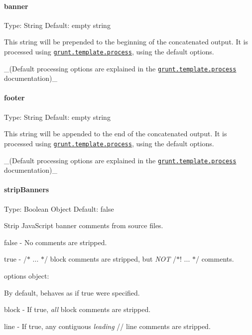 \paragraph*{banner}

Type\+: {\ttfamily String} Default\+: empty string

This string will be prepended to the beginning of the concatenated output. It is processed using \href{https://github.com/gruntjs/grunt-docs/blob/master/grunt.template.md#grunttemplateprocess}{\tt grunt.\+template.\+process}, using the default options.

\+\_\+(Default processing options are explained in the \href{https://github.com/gruntjs/grunt-docs/blob/master/grunt.template.md#grunttemplateprocess}{\tt grunt.\+template.\+process} documentation)\+\_\+

\paragraph*{footer}

Type\+: {\ttfamily String} Default\+: empty string

This string will be appended to the end of the concatenated output. It is processed using \href{https://github.com/gruntjs/grunt-docs/blob/master/grunt.template.md#grunttemplateprocess}{\tt grunt.\+template.\+process}, using the default options.

\+\_\+(Default processing options are explained in the \href{https://github.com/gruntjs/grunt-docs/blob/master/grunt.template.md#grunttemplateprocess}{\tt grunt.\+template.\+process} documentation)\+\_\+

\paragraph*{strip\+Banners}

Type\+: {\ttfamily Boolean} {\ttfamily Object} Default\+: {\ttfamily false}

Strip Java\+Script banner comments from source files.


\begin{DoxyItemize}
\item {\ttfamily false} -\/ No comments are stripped.
\item {\ttfamily true} -\/ {\ttfamily /$\ast$ ... $\ast$/} block comments are stripped, but {\itshape N\+OT} {\ttfamily /$\ast$! ... $\ast$/} comments.
\item {\ttfamily options} object\+:
\begin{DoxyItemize}
\item By default, behaves as if {\ttfamily true} were specified.
\item {\ttfamily block} -\/ If true, {\itshape all} block comments are stripped.
\item {\ttfamily line} -\/ If true, any contiguous {\itshape leading} {\ttfamily //} line comments are stripped.
\end{DoxyItemize}
\end{DoxyItemize}

